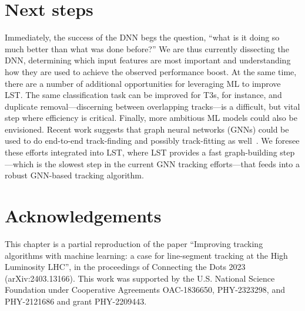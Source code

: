\section{Next steps}
Immediately, the success of the DNN begs the question, ``what is it doing so much better than what was done before?'' 
We are thus currently dissecting the DNN, determining which input features are most important and understanding how they are used to achieve the observed performance boost. 
At the same time, there are a number of additional opportunities for leveraging ML to improve LST. 
The same classification task can be improved for T3s, for instance, and duplicate removal---discerning between overlapping tracks---is a difficult, but vital step where efficiency is critical. 
Finally, more ambitious ML models could also be envisioned. 
Recent work suggests that graph neural networks (GNNs) could be used to do end-to-end track-finding and possibly track-fitting as well~\cite{Ju2021, DeZoortNature2023, lieret2023object}. 
We foresee these efforts integrated into LST, where LST provides a fast graph-building step---which is the slowest step in the current GNN tracking efforts---that feeds into a robust GNN-based tracking algorithm.

\section{Acknowledgements}
This chapter is a partial reproduction of the paper ``Improving tracking algorithms with machine learning: a case for line-segment tracking at the High Luminosity LHC'', in the proceedings of Connecting the Dots 2023 (arXiv:2403.13166). 
This work was supported by the U.S. National Science Foundation under Cooperative Agreements OAC-1836650, PHY-2323298, and PHY-2121686 and grant PHY-2209443.
